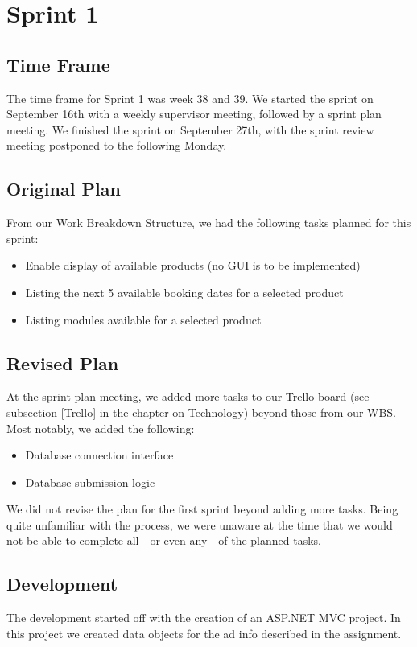 \section{Sprint 1}

\subsection{Time Frame}
The time frame for Sprint 1 was week 38 and 39. We started the sprint on September 16th with a weekly supervisor meeting, followed by a sprint plan meeting. We finished the sprint on September 27th, with the sprint review meeting postponed to the following Monday.

\subsection{Original Plan}
From our Work Breakdown Structure, we had the following tasks planned for this sprint:
\begin{itemize}
	\item Enable display of available products (no GUI is to be implemented)
	\item Listing the next 5 available booking dates for a selected product
	\item Listing modules available for a selected product
\end{itemize}

\subsection{Revised Plan}
At the sprint plan meeting, we added more tasks to our Trello board (see subsection \ref{Trello} in the chapter on Technology) beyond those from our WBS. Most notably, we added the following:
\begin{itemize}
	\item Database connection interface
	\item Database submission logic
\end{itemize}

We did not revise the plan for the first sprint beyond adding more tasks. Being quite unfamiliar with the process, we were unaware at the time that we would not be able to complete all - or even any - of the planned tasks.

\subsection{Development}
The development started off with the creation of an ASP.NET MVC project. In this project we created data objects for the ad info described in the assignment.

